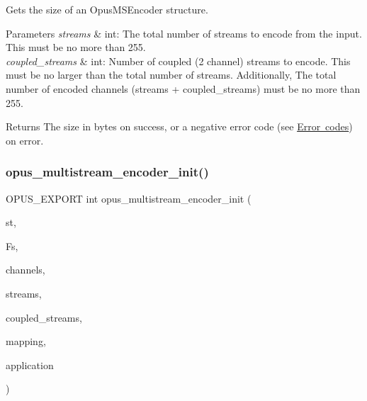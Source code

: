 Gets the size of an Opus\+M\+S\+Encoder structure. 
\begin{DoxyParams}{Parameters}
{\em streams} & {\ttfamily int}\+: The total number of streams to encode from the input. This must be no more than 255. \\
\hline
{\em coupled\+\_\+streams} & {\ttfamily int}\+: Number of coupled (2 channel) streams to encode. This must be no larger than the total number of streams. Additionally, The total number of encoded channels ({\ttfamily streams + coupled\+\_\+streams}) must be no more than 255. \\
\hline
\end{DoxyParams}
\begin{DoxyReturn}{Returns}
The size in bytes on success, or a negative error code (see \mbox{\hyperlink{group__opus__errorcodes}{Error codes}}) on error. 
\end{DoxyReturn}
\mbox{\label{group__opus__multistream_gaf9045180b3a93d7cc3d1197859b767a8}} 
\subsubsection{\texorpdfstring{opus\_multistream\_encoder\_init()}{opus\_multistream\_encoder\_init()}}
{\footnotesize\ttfamily O\+P\+U\+S\+\_\+\+E\+X\+P\+O\+RT int opus\+\_\+multistream\+\_\+encoder\+\_\+init (\begin{DoxyParamCaption}\item[{\mbox{\hyperlink{group__opus__multistream_gae5826674d142fc873ebc1d781c507dd7}{Opus\+M\+S\+Encoder}} $\ast$}]{st,  }\item[{\mbox{\hyperlink{opus__types_8h_aa4d309d6f80b99dbabebc8f98879ab9a}{opus\+\_\+int32}}}]{Fs,  }\item[{int}]{channels,  }\item[{int}]{streams,  }\item[{int}]{coupled\+\_\+streams,  }\item[{const unsigned char $\ast$}]{mapping,  }\item[{int}]{application }\end{DoxyParamCaption})}

